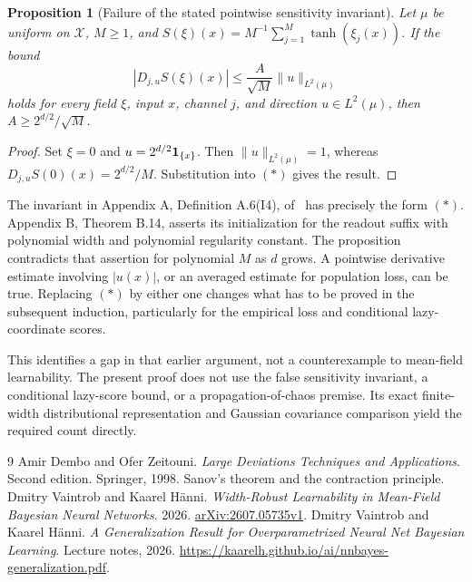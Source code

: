\documentclass[11pt]{article}
\newtheorem{proposition}[theorem]{Proposition}
\theoremstyle{remark}\newtheorem{remark}[theorem]{Remark}
\begin{document}
\begin{proposition}[Failure of the stated pointwise sensitivity invariant]
Let $\mu$ be uniform on $\mathcal X$, $M\geq1$, and
$S(\xi)(x)=M^{-1}\sum_{j=1}^M\tanh(\xi_j(x))$.
If the bound
\[
 |D_{j,u}S(\xi)(x)|\leq\frac A{\sqrt M}\|u\|_{L^2(\mu)}
 \tag{$*$}
\]
holds for every field $\xi$, input $x$, channel $j$, and direction
$u\in L^2(\mu)$, then $A\geq2^{d/2}/\sqrt M$.
\end{proposition}
\begin{proof}
Set $\xi=0$ and $u=2^{d/2}{\bf1}_{\{x\}}$. Then
$\|u\|_{L^2(\mu)}=1$, whereas
$D_{j,u}S(0)(x)=2^{d/2}/M$. Substitution into $(*)$ gives the result.
\end{proof}
The invariant in Appendix A, Definition A.6(I4), of~\cite{mft} has precisely
the form $(*)$. Appendix B, Theorem B.14, asserts its initialization for the
readout suffix with polynomial width and polynomial regularity constant.
The proposition contradicts that assertion for polynomial $M$ as $d$ grows.
A pointwise derivative estimate involving $|u(x)|$, or an averaged estimate
for population loss, can be true. Replacing $(*)$ by either one changes what
has to be proved in the subsequent induction, particularly for the empirical
loss and conditional lazy-coordinate scores.

This identifies a gap in that earlier argument, not a counterexample to
mean-field learnability. The present proof does not use the false sensitivity
invariant, a conditional lazy-score bound, or a propagation-of-chaos premise.
Its exact finite-width distributional representation and Gaussian covariance
comparison yield the required count directly.

\begin{thebibliography}{9}
 Amir Dembo and Ofer Zeitouni.
\emph{Large Deviations Techniques and Applications}. Second edition.
Springer, 1998. Sanov's theorem and the contraction principle.
 Dmitry Vaintrob and Kaarel H\"anni.
\emph{Width-Robust Learnability in Mean-Field Bayesian Neural Networks}.
2026. \href{https://arxiv.org/abs/2607.05735}{arXiv:2607.05735v1}.
 Dmitry Vaintrob and Kaarel H\"anni.
\emph{A Generalization Result for Overparametrized Neural Net Bayesian Learning}.
Lecture notes, 2026.
\url{https://kaarelh.github.io/ai/nnbayes-generalization.pdf}.
\end{thebibliography}
\end{document}
